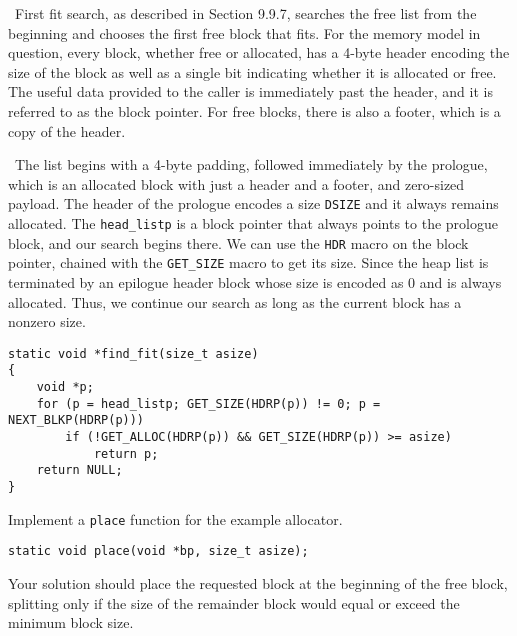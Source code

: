 \documentclass[12pt]{article}
\newenvironment{ex}[2][Exercise]{\begin{trivlist}
		\item[\hskip \labelsep {\bfseries #1}\hskip \labelsep {\bfseries #2.}]}{\end{trivlist}}
\newenvironment{sol}[1][Solution]{\begin{trivlist}
		\item[\hskip \labelsep {\bfseries #1:}]}{\end{trivlist}}
\begin{document}
\begin{sol}
	\
	First fit search, as described in Section 9.9.7, searches the free list from the
	beginning and chooses the first free block that fits. For the memory model in question,
	every block, whether free or allocated, has a 4-byte header encoding the size of the block
	as well as a single bit indicating whether it is allocated or free. The useful data
	provided to the caller is immediately past the header, and it is referred to as the
	block pointer. For free blocks, there is also a footer, which is a copy of the header.
	
	\
	The list begins with a 4-byte padding, followed immediately by the prologue, which
	is an allocated block with just a header and a footer, and zero-sized payload.
	The header of the prologue encodes a size \texttt{DSIZE} and it always remains allocated.
	The \texttt{head\_listp} is a block pointer that always points to the prologue block, and
	our search begins there. We can use the \texttt{HDR} macro on the block pointer, chained with
	the \texttt{GET\_SIZE} macro to get its size. Since the heap list is terminated by an epilogue
	header block whose size is encoded as 0 and is always allocated. Thus, we continue our search
	as long as the current block has a nonzero size.
	
	\begin{lstlisting}
static void *find_fit(size_t asize)
{
	void *p;
	for (p = head_listp; GET_SIZE(HDRP(p)) != 0; p = NEXT_BLKP(HDRP(p)))
		if (!GET_ALLOC(HDRP(p)) && GET_SIZE(HDRP(p)) >= asize)
			return p;
	return NULL;
}
	\end{lstlisting}
\end{sol}

\begin{ex}{9.9}
	Implement a \texttt{place} function for the example allocator.
	\begin{lstlisting}
static void place(void *bp, size_t asize);
	\end{lstlisting}
	Your solution should place the requested block at the beginning of the free block, splitting
	only if the size of the remainder block would equal or exceed the minimum block size.
\end{ex}
\end{document}
